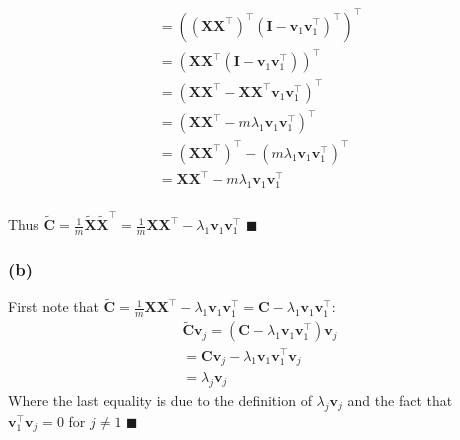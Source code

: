 \documentclass[11pt, oneside]{article}   	%
\begin{document}
\begin{gather*}
= ((\boldsymbol{X} \boldsymbol{X}^{\top})^{\top}(\boldsymbol{I} - \boldsymbol{v}_{1} \boldsymbol{v}_{1}^{\top})^{\top})^{\top}\\
= (\boldsymbol{X} \boldsymbol{X}^{\top}(\boldsymbol{I} - \boldsymbol{v}_{1} \boldsymbol{v}_{1}^{\top}))^{\top}\\
= (\boldsymbol{X} \boldsymbol{X}^{\top} - \boldsymbol{X} \boldsymbol{X}^{\top}\boldsymbol{v}_{1} \boldsymbol{v}_{1}^{\top})^{\top}\\
= (\boldsymbol{X} \boldsymbol{X}^{\top} - m\lambda_1\boldsymbol{v}_{1} \boldsymbol{v}_{1}^{\top})^{\top}\\
= (\boldsymbol{X} \boldsymbol{X}^{\top})^{\top} - (m\lambda_1\boldsymbol{v}_{1} \boldsymbol{v}_{1}^{\top})^{\top}\\
= \boldsymbol{X} \boldsymbol{X}^{\top} - m\lambda_1\boldsymbol{v}_{1} \boldsymbol{v}_{1}^{\top}\\
\end{gather*}

Thus $\boldsymbol{\tilde{C}} = \frac{1}{m} \boldsymbol{\tilde{X}} \boldsymbol{\tilde{X}}^{\top} = \frac{1}{m} \boldsymbol{X} \boldsymbol{X}^{\top} - \lambda_1\boldsymbol{v}_{1} \boldsymbol{v}_{1}^{\top}$ $\blacksquare$

\subsubsection{(b)}
First note that $\boldsymbol{\tilde{C}} = \frac{1}{m} \boldsymbol{X} \boldsymbol{X}^{\top} - \lambda_1\boldsymbol{v}_{1} \boldsymbol{v}_{1}^{\top} = \boldsymbol{C} - \lambda_1\boldsymbol{v}_{1} \boldsymbol{v}_{1}^{\top}$:
\begin{gather*}
\boldsymbol{\tilde{C}}\boldsymbol{v}_j = (\boldsymbol{C} - \lambda_1\boldsymbol{v}_{1} \boldsymbol{v}_{1}^{\top})\boldsymbol{v}_j \\
= \boldsymbol{C}\boldsymbol{v}_j - \lambda_1\boldsymbol{v}_{1} \boldsymbol{v}_{1}^{\top}\boldsymbol{v}_j\\
= \lambda_j\boldsymbol{v}_j
\end{gather*}
Where the last equality is due to the definition of $\lambda_j\boldsymbol{v}_j$ and the fact that $\boldsymbol{v}_{1}^{\top}\boldsymbol{v}_j = 0$ for $j \neq 1$ $\blacksquare$
\end{document}
